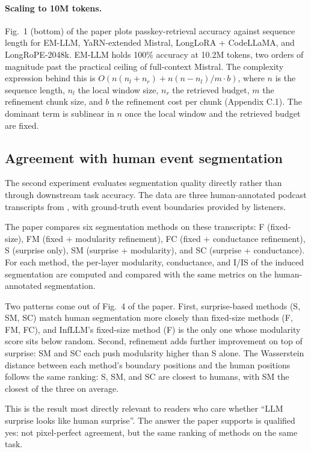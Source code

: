 \paragraph{Scaling to 10M tokens.}
Fig.~1 (bottom) of the paper plots passkey-retrieval accuracy against sequence length for EM-LLM, YaRN-extended Mistral, LongLoRA + CodeLLaMA, and LongRoPE-2048k. EM-LLM holds 100\% accuracy at 10.2M tokens, two orders of magnitude past the practical ceiling of full-context Mistral. The complexity expression behind this is $O(n(n_l + n_r) + n(n - n_l)/m \cdot b)$, where $n$ is the sequence length, $n_l$ the local window size, $n_r$ the retrieved budget, $m$ the refinement chunk size, and $b$ the refinement cost per chunk (Appendix C.1). The dominant term is sublinear in $n$ once the local window and the retrieved budget are fixed.

\subsection{Agreement with human event segmentation}
\label{sec:human-alignment}

The second experiment evaluates segmentation quality directly rather than through downstream task accuracy. The data are three human-annotated podcast transcripts from \textcite{kumar2023neural}, with ground-truth event boundaries provided by listeners.

The paper compares six segmentation methods on these transcripts: F (fixed-size), FM (fixed + modularity refinement), FC (fixed + conductance refinement), S (surprise only), SM (surprise + modularity), and SC (surprise + conductance). For each method, the per-layer modularity, conductance, and I/IS of the induced segmentation are computed and compared with the same metrics on the human-annotated segmentation.

Two patterns come out of Fig.~4 of the paper. First, surprise-based methods (S, SM, SC) match human segmentation more closely than fixed-size methods (F, FM, FC), and InfLLM's fixed-size method (F) is the only one whose modularity score sits below random. Second, refinement adds further improvement on top of surprise: SM and SC each push modularity higher than S alone. The Wasserstein distance between each method's boundary positions and the human positions follows the same ranking: S, SM, and SC are closest to humans, with SM the closest of the three on average.

This is the result most directly relevant to readers who care whether ``LLM surprise looks like human surprise''. The answer the paper supports is qualified yes: not pixel-perfect agreement, but the same ranking of methods on the same task.


